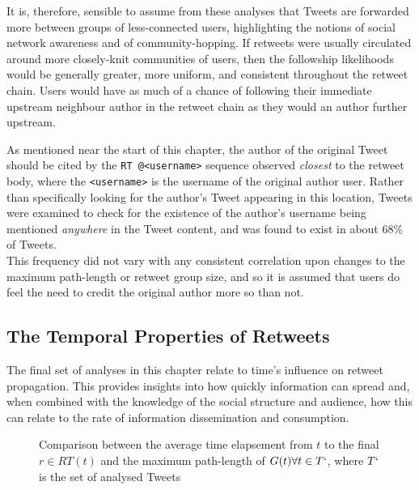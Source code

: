 It is, therefore, sensible to assume from these analyses that Tweets are forwarded more between groups of less-connected users, highlighting the notions of social network awareness and of community-hopping. If retweets were usually circulated around more closely-knit communities of users, then the followship likelihoods would be generally greater, more uniform, and consistent throughout the retweet chain. Users would have as much of a chance of following their immediate upstream neighbour author in the retweet chain as they would an author further upstream.

As mentioned near the start of this chapter, the author of the original Tweet should be cited by the \texttt{RT @<username>} sequence observed \textit{closest} to the retweet body, where the \texttt{<username>} is the username of the original author user. Rather than specifically looking for the author's Tweet appearing in this location, Tweets were examined to check for the existence of the author's username being mentioned \textit{anywhere} in the Tweet content, and was found to exist in about 68\% of Tweets.\\
This frequency did not vary with any consistent correlation upon changes to the maximum path-length or retweet group size, and so it is assumed that users do feel the need to credit the original author more so than not. 

 
\subsection{The Temporal Properties of Retweets}
The final set of analyses in this chapter relate to time's influence on retweet propagation. This provides insights into how quickly information can spread and, when combined with the knowledge of the social structure and audience, how this can relate to the rate of information dissemination and consumption.

\begin{figure}[h]
\centering
    \caption{Comparison between the average time elapsement from $t$ to the final $r \in RT(t)$ and the maximum path-length of $G(t) \forall t \in T`$, where $T`$ is the set of analysed Tweets}
\label{fig:timedelay-pathlength}
\end{figure}

